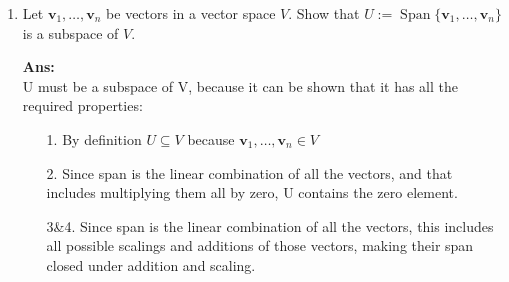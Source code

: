 \documentclass[12pt,oneside]{amsart}
\newcommand{\bv}{\mathbf{v}}
\newcommand\sol[1]{
\medskip
\begin{mdframed}
\textbf{Ans:\\} #1
\end{mdframed}
\medskip
}
\DeclareMathOperator{\Span}{Span}
\begin{document}
\begin{enumerate}
\sol{
  \begin{enumerate} 
    \item
      Not a subspace\\ This is not a subspace because it is not closed under addition. If we add two functions where $f(0)=1$, we will get a function where $f(0)=2$.
    \item
      Subspace\\
      \begin{enumerate}
        \item
          Addition\\$f(3)+f(3)=0+0=0$ So it is closed under addition.
        \item
          Scaling\\$af(3)=a\cdot0=0$ So it is closed under scaling.
        \item
          Zero vector\\Contains the zero vector $f(x)=0$.
      \end{enumerate}
    \item
      Subspace\\
      \begin{enumerate}
        \item
          Addition\\Two continuous functions added cannot create a discontinuous function (closed under addition).
        \item
          Scaling\\Scaling a continuous function creates a new continuous function (closed under scaling).
        \item
          The zero vector $f(x)=0$ is continuous.
      \end{enumerate}

  \end{enumerate}
}

\item Let $\bv_1,\ldots,\bv_n$ be vectors in a vector space $V$.
Show that $U := \Span\{\bv_1,\ldots,\bv_n\}$ is a subspace of $V$.
\sol{
  U must be a subspace of V, because it can be shown that it has all the required properties:
  \begin{itemize}
    \item[1.] By definition $U \subseteq V$ because $\bv_1,\ldots,\bv_n\in V$
    \item[2.] Since span is the linear combination of all the vectors, and that includes multiplying them all by zero, U contains the zero element.
    \item[3\&4.] Since span is the linear combination of all the vectors, this includes all possible scalings and additions of those vectors, making their span closed under addition and scaling.
  \end{itemize}
}



\end{enumerate}
\end{document}
